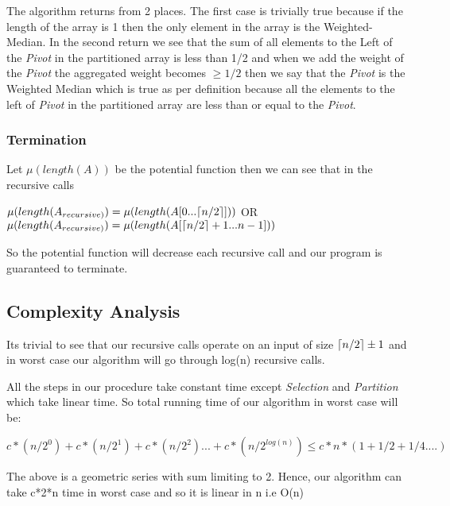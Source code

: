 \documentclass[8pt]{article}
\DeclarePairedDelimiter\ceil{\lceil}{\rceil}
\begin{document}
\begin{flushleft}
The algorithm returns from 2 places. The first case is trivially true because if the length
of the array is 1 then the only element in the array is the Weighted-Median. In the second
return we see that the sum of all elements to the Left of the \textit{Pivot} in the partitioned
array is less than 1/2 and when we add the weight of the \textit{Pivot} the aggregated weight
becomes $\geq{1/2}$ then we say that the \textit{Pivot} is the Weighted Median which is true
as per definition because all the elements to the left of \textit{Pivot} in the partitioned
array are less than or equal to the \textit{Pivot}.

\subsubsection{Termination}
Let $\mu(length(A))$ be the potential function then we can see that in the recursive calls

\begin{center}
$\mu(length(A_{recursive)}) = \mu(length(A[0...\ceil{n/2}]))$ OR $\mu(length(A_{recursive)}) = \mu(length(A[\ceil{n/2} + 1 ... n - 1]))$
\end{center}

So the potential function will decrease each recursive call and our program is guaranteed to terminate.

\subsection{Complexity Analysis}
Its trivial to see that our recursive calls operate on an input of size $\ceil{n/2} \pm 1$ and in 
worst case our algorithm will go through log(n) recursive calls.

All the steps in our procedure take constant time except \textit{Selection} and \textit{Partition}
which take linear time. So total running time of our algorithm in worst case will be:
\begin{center}
$c*(n/2^0) + c*(n/2^1) + c*(n/2^2) ... + c*(n/2^{log(n)}) \le c*n*(1 + 1/2 + 1/4 ....)$
\end{center}
The above is a geometric series with sum limiting to 2. Hence, our algorithm can take c*2*n time in worst case and so it is linear in n i.e O(n)
\end{flushleft}
\end{document}
